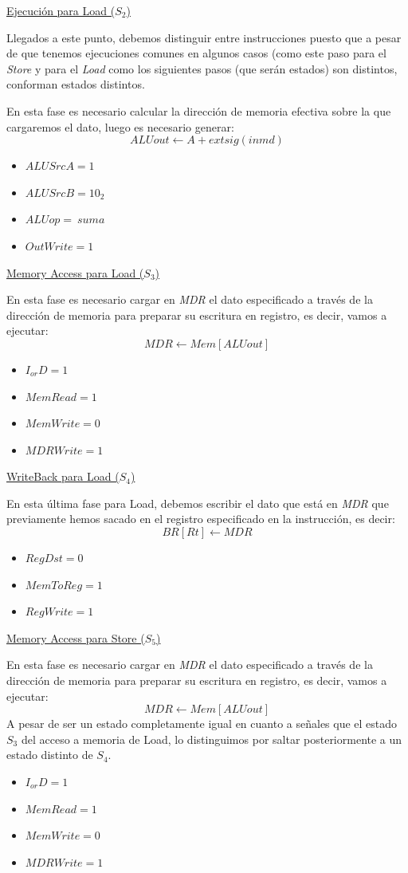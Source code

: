 \documentclass[a4paper,10pt]{book}
\begin{document}
\underline{Ejecución para Load ($S_2$)}

Llegados a este punto, debemos distinguir entre instrucciones puesto que a pesar de que tenemos ejecuciones comunes en algunos casos (como este paso para el \textit{Store} y para el \textit{Load} como los siguientes pasos (que serán estados) son distintos, conforman estados distintos.

En esta fase es necesario calcular la dirección de memoria efectiva sobre la que cargaremos el dato, luego es necesario generar:
$$ALUout \leftarrow A + extsig(inmd)$$
\begin{itemize}
\item $ALUSrcA = 1$
\item $ALUSrcB = 10_2$
\item $ALUop = \ suma$
\item $OutWrite = 1$
\end{itemize}

\underline{Memory Access para Load ($S_3$)}

En esta fase es necesario cargar en \textit{MDR} el dato especificado a través de la dirección de memoria para preparar su escritura en registro, es decir, vamos a ejecutar:
$$MDR \leftarrow Mem[ALUout]$$
\begin{itemize}
\item $I_{or}D = 1$
\item $MemRead = 1$
\item $MemWrite = 0$
\item $MDRWrite = 1$
\end{itemize}

\underline{WriteBack para Load ($S_4$)}

En esta última fase para Load, debemos escribir el dato que está en \textit{MDR} que previamente hemos sacado en el registro especificado en la instrucción, es decir:
$$BR[Rt] \leftarrow MDR$$
\begin{itemize}
\item $RegDst = 0$
\item $MemToReg = 1$
\item $RegWrite = 1$
\end{itemize}

\underline{Memory Access para Store ($S_5$)}

En esta fase es necesario cargar en \textit{MDR} el dato especificado a través de la dirección de memoria para preparar su escritura en registro, es decir, vamos a ejecutar:
$$MDR \leftarrow Mem[ALUout]$$
A pesar de ser un estado completamente igual en cuanto a señales que el estado $S_3$ del acceso a memoria de Load, lo distinguimos por saltar posteriormente a un estado distinto de $S_4$.
\begin{itemize}
\item $I_{or}D = 1$
\item $MemRead = 1$
\item $MemWrite = 0$
\item $MDRWrite = 1$
\end{itemize}
\end{document}
